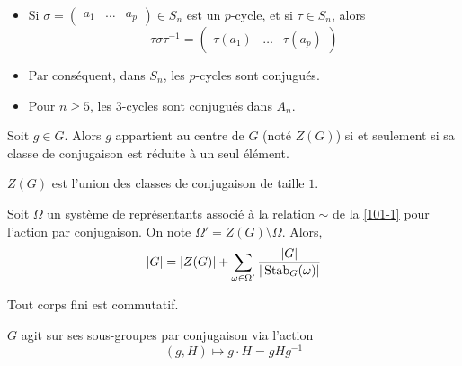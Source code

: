 
  \begin{example}
    \begin{itemize}
      \item Si $\sigma = \begin{pmatrix} a_1 & \dots & a_p \end{pmatrix} \in S_n$ est un $p$-cycle, et si $\tau \in S_n$, alors
      \[ \tau \sigma \tau^{-1} = \begin{pmatrix} \tau(a_1) & \dots & \tau(a_p) \end{pmatrix} \]
      \item Par conséquent, dans $S_n$, les $p$-cycles sont conjugués.
      \item Pour $n \geq 5$, les $3$-cycles sont conjugués dans $A_n$.
    \end{itemize}
  \end{example}


  \begin{proposition}
    Soit $g \in G$. Alors $g$ appartient au centre de $G$ (noté $Z(G)$) si et seulement si sa classe de conjugaison est réduite à un seul élément.
  \end{proposition}

  \begin{corollary}
    $Z(G)$ est l'union des classes de conjugaison de taille $1$.
  \end{corollary}


  \begin{proposition}
    Soit $\Omega$ un système de représentants associé à la relation $\sim$ de la \cref{101-1} pour l'action par conjugaison. On note $\Omega' = Z(G) \setminus \Omega$. Alors,
    \[ |G| = |Z(G)| + \sum_{\omega \in \Omega'} \frac{|G|}{|\operatorname{Stab}_G(\omega)|} \]
  \end{proposition}


  \begin{application}
    Tout corps fini est commutatif.
  \end{application}


  \begin{proposition}
    \label{101-2}
    $G$ agit sur ses sous-groupes par conjugaison via l'action
    \[ (g, H) \mapsto g \cdot H = gHg^{-1} \]
  \end{proposition}

